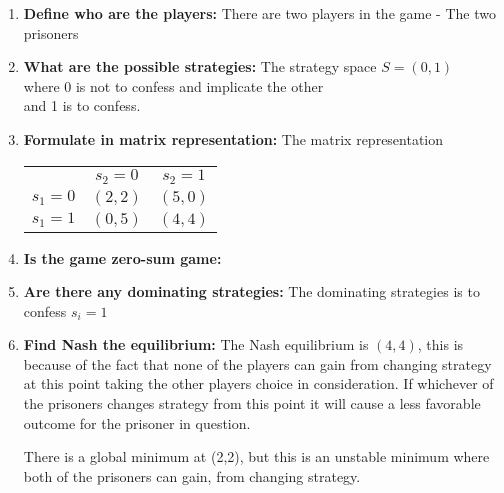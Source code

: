 \begin{enumerate}
\item \textbf{Define who are the players:} There are two players in the game - The two prisoners
\item \textbf{What are the possible strategies:} The strategy space $S = (0,1)$ \\
  where 0 is not to confess and implicate the other                             \\
  and 1 is to confess.
\item \textbf{Formulate in matrix representation:} The matrix representation
  \begin{center}
    \begin{tabular}{ r|c|c| }
      \multicolumn{1}{r}{}
      & \multicolumn{1}{c}{$s_2 = 0$}
      & \multicolumn{1}{c}{$s_2 = 1$}                                   \\
      \cline{2-3}
      $s_1 = 0$ & $(2,2)$ & $(5,0)$                                               \\
      \cline{2-3}
      $s_1 = 1$ & $(0,5)$ & $(4,4)$                                               \\
      \cline{2-3}
    \end{tabular}
  \end{center}
\item \textbf{Is the game zero-sum game:}
\item \textbf{Are there any dominating strategies:} The dominating strategies is to confess $s_i = 1$
\item \textbf{Find Nash the equilibrium:} The Nash equilibrium is $(4,4)$, this is because of the fact that none of the
  players can gain from changing strategy at this point taking the other players choice in consideration. If whichever of
  the prisoners changes strategy from this point it will cause a less favorable outcome for the prisoner in question.

  There is a global minimum at (2,2), but this is an unstable minimum where both of the prisoners can gain, from
  changing strategy.
\end{enumerate}
